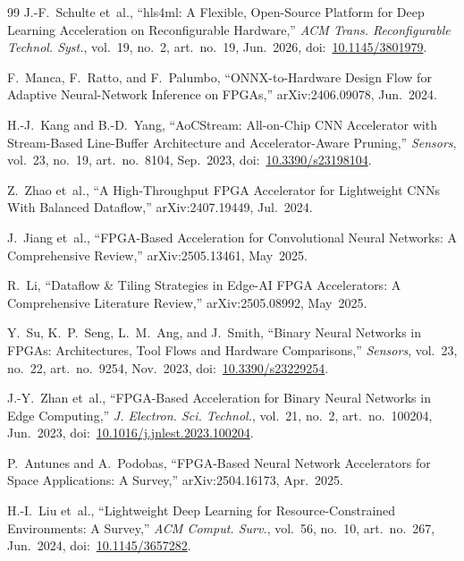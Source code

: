 \documentclass[journal]{IEEEtran}
\begin{document}
\begin{thebibliography}{99}
J.-F.~Schulte et~al.,
``hls4ml: A Flexible, Open-Source Platform for Deep Learning Acceleration on Reconfigurable Hardware,''
\emph{ACM Trans. Reconfigurable Technol. Syst.}, vol.~19, no.~2, art.~no.~19, Jun.~2026,
doi:~\url{10.1145/3801979}.


F.~Manca, F.~Ratto, and F.~Palumbo,
``ONNX-to-Hardware Design Flow for Adaptive Neural-Network Inference on FPGAs,''
arXiv:2406.09078, Jun.~2024.

H.-J.~Kang and B.-D.~Yang,
``AoCStream: All-on-Chip CNN Accelerator with Stream-Based Line-Buffer Architecture and Accelerator-Aware Pruning,''
\emph{Sensors}, vol.~23, no.~19, art.~no.~8104, Sep.~2023,
doi:~\url{10.3390/s23198104}.


Z.~Zhao et~al.,
``A High-Throughput FPGA Accelerator for Lightweight CNNs With Balanced Dataflow,''
arXiv:2407.19449, Jul.~2024.


J.~Jiang et~al.,
``FPGA-Based Acceleration for Convolutional Neural Networks: A Comprehensive Review,''
arXiv:2505.13461, May~2025.

R.~Li,
``Dataflow \& Tiling Strategies in Edge-AI FPGA Accelerators: A Comprehensive Literature Review,''
arXiv:2505.08992, May~2025.

Y.~Su, K.~P.~Seng, L.~M.~Ang, and J.~Smith,
``Binary Neural Networks in FPGAs: Architectures, Tool Flows and Hardware Comparisons,''
\emph{Sensors}, vol.~23, no.~22, art.~no.~9254, Nov.~2023,
doi:~\url{10.3390/s23229254}.

J.-Y.~Zhan et~al.,
``FPGA-Based Acceleration for Binary Neural Networks in Edge Computing,''
\emph{J. Electron. Sci. Technol.}, vol.~21, no.~2, art.~no.~100204, Jun.~2023,
doi:~\url{10.1016/j.jnlest.2023.100204}.

P.~Antunes and A.~Podobas,
``FPGA-Based Neural Network Accelerators for Space Applications: A Survey,''
arXiv:2504.16173, Apr.~2025.

H.-I.~Liu et~al.,
``Lightweight Deep Learning for Resource-Constrained Environments: A Survey,''
\emph{ACM Comput. Surv.}, vol.~56, no.~10, art.~no.~267, Jun.~2024,
doi:~\url{10.1145/3657282}.


\end{thebibliography}
\end{document}
